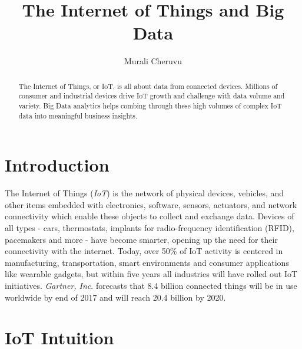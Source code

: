 \documentclass[sigconf]{acmart}
\begin{document}
\title{The Internet of Things and Big Data}


\author{Murali Cheruvu}

\renewcommand{\shortauthors}{M. Cheruvu}


\begin{abstract}

The Internet of Things, or IoT, is all about data from connected devices. Millions of consumer and industrial devices drive IoT growth and challenge with data volume and variety. Big Data analytics helps combing through these high volumes of complex IoT data into meaningful business insights.

\end{abstract}


\maketitle


\section{Introduction}

The Internet of Things ({\em IoT}) is the network of physical devices, vehicles, and other items embedded with electronics, software, sensors, actuators, and network connectivity which enable these objects to collect and exchange data\cite{1wikiiot}. Devices of all types - cars, thermostats, implants for radio-frequency identification (RFID), pacemakers and more - have become smarter, opening up the need for their connectivity with the internet. Today, over 50\% of IoT activity is centered in manufacturing, transportation, smart environments and consumer applications like wearable gadgets, but within five years all industries will have rolled out IoT initiatives. {\em Gartner, Inc}. forecasts that 8.4 billion connected things will be in use worldwide by end of 2017 and will reach 20.4 billion by 2020\cite{2Gartner}. 

\section{IoT Intuition}
\end{document}
